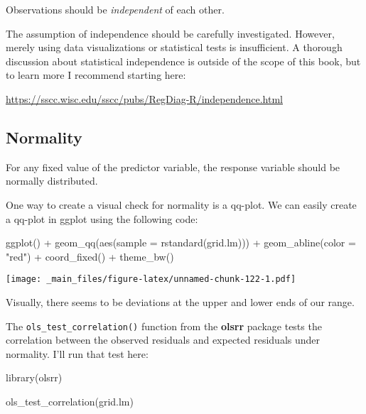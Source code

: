 \documentclass[
]{book}
\newenvironment{Shaded}{\begin{snugshade}}{\end{snugshade}}
\newcommand{\AttributeTok}[1]{\textcolor[rgb]{0.77,0.63,0.00}{#1}}
\newcommand{\FunctionTok}[1]{\textcolor[rgb]{0.00,0.00,0.00}{#1}}
\newcommand{\NormalTok}[1]{#1}
\newcommand{\SpecialCharTok}[1]{\textcolor[rgb]{0.00,0.00,0.00}{#1}}
\newcommand{\StringTok}[1]{\textcolor[rgb]{0.31,0.60,0.02}{#1}}
\begin{document}
Observations should be \emph{independent} of each other.

The assumption of independence should be carefully investigated. However, merely using data visualizations or statistical tests is insufficient. A thorough discussion about statistical independence is outside of the scope of this book, but to learn more I recommend starting here:

\url{https://sscc.wisc.edu/sscc/pubs/RegDiag-R/independence.html}

\hypertarget{normality}{%
\subsection{Normality}\label{normality}}

For any fixed value of the predictor variable, the response variable should be normally distributed.

One way to create a visual check for normality is a qq-plot. We can easily create a qq-plot in ggplot using the following code:

\begin{Shaded}
\begin{Highlighting}[]
\FunctionTok{ggplot}\NormalTok{() }\SpecialCharTok{+}
  \FunctionTok{geom\_qq}\NormalTok{(}\FunctionTok{aes}\NormalTok{(}\AttributeTok{sample =} \FunctionTok{rstandard}\NormalTok{(grid.lm))) }\SpecialCharTok{+}
  \FunctionTok{geom\_abline}\NormalTok{(}\AttributeTok{color =} \StringTok{"red"}\NormalTok{) }\SpecialCharTok{+}
  \FunctionTok{coord\_fixed}\NormalTok{() }\SpecialCharTok{+}
  \FunctionTok{theme\_bw}\NormalTok{()}
\end{Highlighting}
\end{Shaded}

\texttt{[image: \_main\_files/figure-latex/unnamed-chunk-122-1.pdf]}

Visually, there seems to be deviations at the upper and lower ends of our range.

The \texttt{ols\_test\_correlation()} function from the \textbf{olsrr} package tests the correlation between the observed residuals and expected residuals under normality. I'll run that test here:

\begin{Shaded}
\begin{Highlighting}[]
\FunctionTok{library}\NormalTok{(olsrr)}

\FunctionTok{ols\_test\_correlation}\NormalTok{(grid.lm)}
\end{Highlighting}
\end{Shaded}
\end{document}
